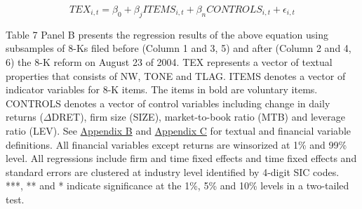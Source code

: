 \begin{equation*}
	TEX_{i,t}=\beta_0+\beta_jITEMS_{i,t}+\beta_nCONTROLS_{i,t}+\epsilon_{i,t}
\end{equation*}

Table 7 Panel B presents the regression results of the above equation using subsamples of 8-Ks filed before (Column 1 and 3, 5) and after (Column 2 and 4, 6) the 8-K reform on August 23 of 2004. TEX represents a vector of textual properties that consists of NW, TONE and TLAG. ITEMS denotes a vector of indicator variables for 8-K items. The items in bold are voluntary items. CONTROLS denotes a vector of control variables including change in daily returns ($\Delta$DRET), firm size (SIZE), market-to-book ratio (MTB) and leverage ratio (LEV). See \hyperref[appb]{Appendix B} and \hyperref[appc]{Appendix C} for textual and financial variable definitions. All financial variables except returns are winsorized at 1\% and 99\% level. All regressions include firm and time fixed effects and time fixed effects and standard errors are clustered at industry level identified by 4-digit SIC codes. ***, ** and * indicate significance at the 1\%, 5\% and 10\% levels in a two-tailed test. 

